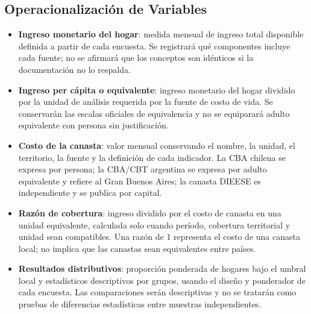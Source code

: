 \subsection{Operacionalización de Variables}
\begin{itemize}
    \item \textbf{Ingreso monetario del hogar}: medida mensual de ingreso total disponible definida a partir de cada encuesta. Se registrará qué componentes incluye cada fuente; no se afirmará que los conceptos son idénticos si la documentación no lo respalda.
    \item \textbf{Ingreso per cápita o equivalente}: ingreso monetario del hogar dividido por la unidad de análisis requerida por la fuente de costo de vida. Se conservarán las escalas oficiales de equivalencia y no se equiparará adulto equivalente con persona sin justificación.
    \item \textbf{Costo de la canasta}: valor mensual conservando el nombre, la unidad, el territorio, la fuente y la definición de cada indicador. La CBA chilena se expresa por persona; la CBA/CBT argentina se expresa por adulto equivalente y refiere al Gran Buenos Aires; la canasta DIEESE es independiente y se publica por capital.
    \item \textbf{Razón de cobertura}: ingreso dividido por el costo de canasta en una unidad equivalente, calculada solo cuando período, cobertura territorial y unidad sean compatibles. Una razón de 1 representa el costo de una canasta local; no implica que las canastas sean equivalentes entre países.
    \item \textbf{Resultados distributivos}: proporción ponderada de hogares bajo el umbral local y estadísticos descriptivos por grupos, usando el diseño y ponderador de cada encuesta. Las comparaciones serán descriptivas y no se tratarán como pruebas de diferencias estadísticas entre muestras independientes.
\end{itemize}

